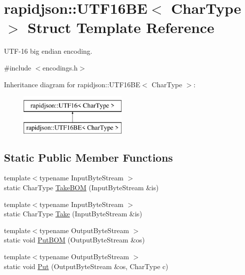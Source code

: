 \hypertarget{structrapidjson_1_1_u_t_f16_b_e}{}\section{rapidjson\+::U\+T\+F16\+BE$<$ Char\+Type $>$ Struct Template Reference}
\label{structrapidjson_1_1_u_t_f16_b_e}


U\+T\+F-\/16 big endian encoding.  




{\ttfamily \#include $<$encodings.\+h$>$}

Inheritance diagram for rapidjson\+::U\+T\+F16\+BE$<$ Char\+Type $>$\+:\begin{figure}[H]
\begin{center}
\leavevmode
\includegraphics[height=2.000000cm]{structrapidjson_1_1_u_t_f16_b_e}
\end{center}
\end{figure}
\subsection*{Static Public Member Functions}
\begin{DoxyCompactItemize}
\item 
{\footnotesize template$<$typename Input\+Byte\+Stream $>$ }\\static Char\+Type \mbox{\hyperlink{structrapidjson_1_1_u_t_f16_b_e_ae1123c32004f55f68d86067bc83e6334}{Take\+B\+OM}} (Input\+Byte\+Stream \&is)
\item 
{\footnotesize template$<$typename Input\+Byte\+Stream $>$ }\\static Char\+Type \mbox{\hyperlink{structrapidjson_1_1_u_t_f16_b_e_aac247d0536fd7bb1a5a9b17f091f0d9a}{Take}} (Input\+Byte\+Stream \&is)
\item 
{\footnotesize template$<$typename Output\+Byte\+Stream $>$ }\\static void \mbox{\hyperlink{structrapidjson_1_1_u_t_f16_b_e_a095c3a1e62917798b8ba0319abe0a987}{Put\+B\+OM}} (Output\+Byte\+Stream \&os)
\item 
{\footnotesize template$<$typename Output\+Byte\+Stream $>$ }\\static void \mbox{\hyperlink{structrapidjson_1_1_u_t_f16_b_e_a48f83982227d52c563f5c336deb73a44}{Put}} (Output\+Byte\+Stream \&os, Char\+Type c)
\end{DoxyCompactItemize}
